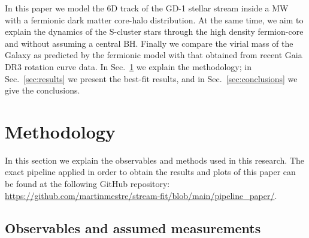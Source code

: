 \documentclass[twocolumn]{aa}
\begin{document}
In this paper we model the 6D track of the GD-1 stellar stream inside a MW with a fermionic dark matter core-halo distribution. At the same time, we aim to explain the dynamics of the S-cluster stars through the high density fermion-core and without assuming a central BH. Finally we compare the virial mass of the Galaxy as predicted by the fermionic model with that obtained from recent Gaia DR3 rotation curve data. In Sec.~\ref{sec:methodology} we explain the methodology; in Sec.~\ref{sec:results} we present the best-fit results, and in Sec.~\ref{sec:conclusions} we give the conclusions.

\section{Methodology}
\label{sec:methodology}
In this section we explain the observables and methods used in this research.
The exact pipeline applied in order to obtain the results and plots of this paper
can be found at the following GitHub repository:
\url{https://github.com/martinmestre/stream-fit/blob/main/pipeline_paper/}.

\subsection{Observables and assumed measurements}
\label{sec:observables}
\end{document}
